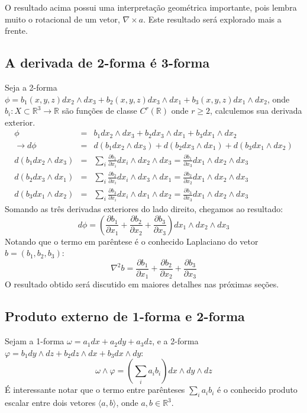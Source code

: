 O resultado acima possui uma interpretação geométrica importante, 
pois lembra muito o rotacional de um vetor, $\nabla \times a$. 
Este resultado será explorado mais a frente. 




\subsection{A derivada de 2-forma é 3-forma} 

Seja a 2-forma $\phi = b_{1}(x,y,z)dx_2 \wedge dx_3 + b_{2} (x,y,z) 
dx_3 \wedge dx_1 + b_{3}(x,y,z)dx_1 \wedge dx_2$, onde 
$b_i:X\subset \mathbb{R}^3 \to \mathbb{R}$ são funções de 
classe $C^r(\mathbb{R})$ onde $r \geq 2$, calculemos sua 
derivada exterior.
%
\begin{eqnarray*}
\phi                        &=& b_{1}dx_2 \wedge dx_3 + b_{2} dx_3 
\wedge dx_1 + b_{3} dx_1 \wedge dx_2 
\\
\to d\phi                   &=& d(b_1 dx_2 \wedge dx_3) 
+ d(b_2 dx_3 \wedge dx_1) + d(b_3 dx_1 \wedge dx_2) 
\\
d(b_1 dx_2 \wedge dx_3) &=& \sum_{i} \frac{\partial b_1}{\partial x_i} dx_i 
\wedge dx_2 \wedge dx_3 = \frac{\partial b_1}{\partial x_3} dx_1 
\wedge dx_2 \wedge dx_3   
\\
d(b_2 dx_3 \wedge dx_1) &=& \sum_{i} \frac{\partial b_2}{\partial x_i} dx_i 
\wedge dx_3 \wedge dx_1 = \frac{\partial b_2}{\partial x_2} dx_1 
\wedge dx_2 \wedge dx_3   
\\
d(b_3 dx_1 \wedge dx_2) &=& \sum_{i} \frac{\partial b_3}{\partial x_i} dx_i 
\wedge dx_1 \wedge dx_2 = \frac{\partial b_3}{\partial x_3} dx_1 
\wedge dx_2 \wedge dx_3 
\end{eqnarray*}
%
Somando as três derivadas exteriores do lado direito, chegamos ao resultado:
%
\[
d\phi = \left(\frac{\partial b_1}{\partial x_1} 
+ \frac{\partial b_2}{\partial x_2} 
+ \frac{\partial b_3}{\partial x_3}\right) dx_1 
\wedge dx_2 \wedge dx_3
\]
%
Notando que o termo em parêntese é o conhecido Laplaciano 
do vetor $b = (b_1,b_2,b_3)$:
%
\[
\nabla^2b = \frac{\partial b_1}{\partial x_1} 
+ \frac{\partial b_2}{\partial x_2} 
+ \frac{\partial b_3}{\partial x_3}
\]
%
O resultado obtido será discutido em maiores detalhes 
nas próximas seções.




\subsection{Produto externo de 1-forma e 2-forma}
Sejam a 1-forma $\omega = a_1dx + a_2dy + a_3dz$, e a 2-forma 
$\varphi = b_1 dy\wedge dz + b_2 dz \wedge dx + b_3 dx \wedge dy$:
%
%
\[
\omega \wedge \varphi = \left(\sum_{i}a_i b_i\right)dx 
\wedge dy \wedge dz
\]
%
É interessante notar que o termo entre parênteses 
$\sum_{i}a_i b_i$ é o conhecido produto escalar entre dois 
vetores $\langle a,b\rangle$, onde $a,b\in\mathbb{R}^3$.




